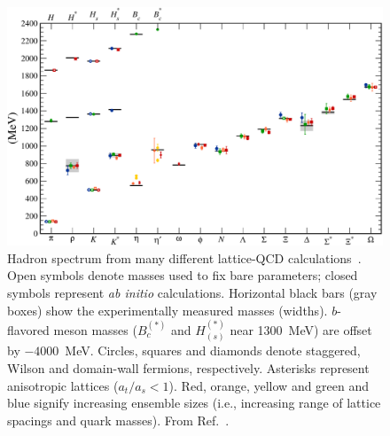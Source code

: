 \begin{figure}
    \centering
    \includegraphics[width=\linewidth]{CpF-T3/spectrum.pdf}
    \caption[Hadron spectrum from many different lattice-QCD calculations]{Hadron spectrum from many 
        different lattice-QCD calculations~\cite{Aubin:2004wf,Aoki:2008sm,Durr:2008zz,Bazavov:2009bb,Christ:2010dd,Bernard:2010fr,Gregory:2010gm,Dudek:2011tt,Bietenholz:2011qq,Mohler:2011ke,Gregory:2011sg}.
        Open symbols denote masses used to fix bare parameters; closed symbols represent \emph{ab initio}
        calculations.
        Horizontal black bars (gray boxes) show the experimentally measured masses (widths).
        $b$-flavored meson masses ($B_c^{(*)}$ and $H_{(s)}^{(*)}$ near 1300~MeV) are offset by $-4000$~MeV.
        Circles, squares and diamonds denote staggered, Wilson and domain-wall fermions, respectively.
        Asterisks represent anisotropic lattices ($a_t/a_s<1$).
        Red, orange, yellow and green and blue signify increasing ensemble sizes (i.e., increasing range of 
        lattice spacings and quark masses).
        From Ref.~\cite{Kronfeld:2012uk}.}
    \label{lqcd:fig:spectrum}
\end{figure}

